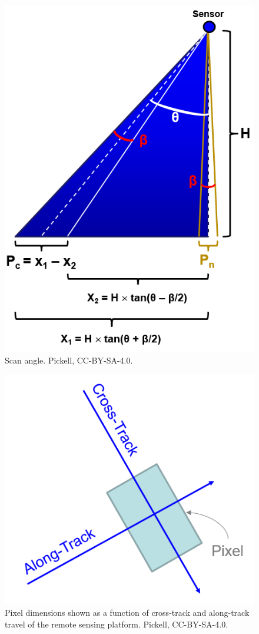 \documentclass[
]{book}
\begin{document}
\begin{figure}
\includegraphics[width=0.75\linewidth]{images/12-scan-angle} \caption{Scan angle. Pickell, CC-BY-SA-4.0.}\label{fig:12-scan-angle}
\end{figure}

\begin{figure}
\includegraphics[width=0.75\linewidth]{images/12-cross-track-along-track} \caption{Pixel dimensions shown as a function of cross-track and along-track travel of the remote sensing platform. Pickell, CC-BY-SA-4.0.}\label{fig:12-cross-track-along-track}
\end{figure}
\end{document}

